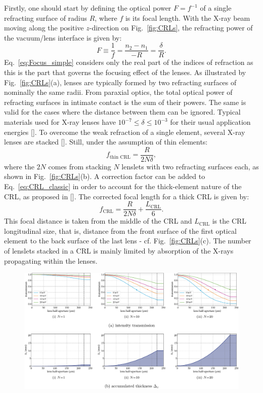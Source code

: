 \begin{refsection}
Firstly, one should start by defining the optical power $F=f^{-1}$ of a single refracting surface of radius $R$, where $f$ is its focal length. With the X-ray beam moving along the positive $z$-direction on Fig.~\ref{fig:CRLs}, the refracting power of the vacuum/lens interface is given by:
\begin{equation}\label{eq:Focus_simple}
    F\equiv\frac{1}{f}=\frac{n_2-n_1}{-R}=\frac{\delta}{R}.
\end{equation}{}
Eq.~\ref{eq:Focus_simple} considers only the real part of the indices of refraction as this is the part that governs the focusing effect of the lenses. As illustrated by Fig.~\ref{fig:CRLs}(a), lenses are typically formed by two refracting surfaces of nominally the same radii. From paraxial optics, the total optical power of refracting surfaces in intimate contact is the sum of their powers. The same is valid for the cases where the distance between them can be ignored. Typical materials used for X-ray lenses have $10^{-7}\leq\delta\leq10^{-3}$ for their usual application energies [\cite{Serebrennikov2016}]. To overcome the weak refraction of a single element, several X-ray lenses are stacked [\cite{Tomie1994, Snigirev1996}]. Still, under the assumption of thin elements:
\begin{equation}\label{eq:CRL_classic}
    f_{\text{thin}\text{~CRL}} = \frac{R}{2N\delta},
\end{equation}{}
where the $2N$ comes from stacking $N$ lenslets with two refracting surfaces each, as shown in Fig.~\ref{fig:CRLs}(b). A correction factor can be added to Eq.~\ref{eq:CRL_classic} in order to account for the thick-element nature of the CRL, as proposed in [\cite{Kohn2003}]. The corrected focal length for a thick CRL is given by:
\begin{equation}\label{eq:CRL}
        f_{\text{CRL}} = \frac{R}{2N\delta}+\frac{L_{\text{CRL}}}{6}.
\end{equation}{}
This focal distance is taken from the middle of the CRL and $L_{\text{CRL}}$ is the CRL longitudinal size, that is, distance from the front surface of the first optical element to the back surface of the last lens - cf. Fig.~\ref{fig:CRLs}(c). The number of lenslets stacked in a CRL is mainly limited by absorption of the X-rays propagating within the lenses. 
\begin{figure}[t]
    \centering
    \includegraphics[width=1\linewidth]{figures/ch03/Aeff.pdf}

\end{figure}
\end{refsection}
